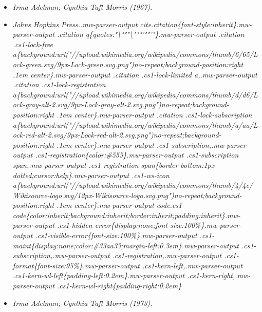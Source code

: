 \begin{itemize}
\item
  \emph{Irma Adelman; Cynthia Taft Morris (1967).}
\item
  \emph{Johns Hopkins Press..mw-parser-output
  cite.citation\{font-style:inherit\}.mw-parser-output .citation
  q\{quotes:"\textbackslash{}"""\textbackslash{}"""'""'"\}.mw-parser-output
  .citation .cs1-lock-free
  a\{background:url("//upload.wikimedia.org/wikipedia/commons/thumb/6/65/Lock-green.svg/9px-Lock-green.svg.png")no-repeat;background-position:right
  .1em center\}.mw-parser-output .citation .cs1-lock-limited
  a,.mw-parser-output .citation .cs1-lock-registration
  a\{background:url("//upload.wikimedia.org/wikipedia/commons/thumb/d/d6/Lock-gray-alt-2.svg/9px-Lock-gray-alt-2.svg.png")no-repeat;background-position:right
  .1em center\}.mw-parser-output .citation .cs1-lock-subscription
  a\{background:url("//upload.wikimedia.org/wikipedia/commons/thumb/a/aa/Lock-red-alt-2.svg/9px-Lock-red-alt-2.svg.png")no-repeat;background-position:right
  .1em center\}.mw-parser-output .cs1-subscription,.mw-parser-output
  .cs1-registration\{color:\#555\}.mw-parser-output .cs1-subscription
  span,.mw-parser-output .cs1-registration span\{border-bottom:1px
  dotted;cursor:help\}.mw-parser-output .cs1-ws-icon
  a\{background:url("//upload.wikimedia.org/wikipedia/commons/thumb/4/4c/Wikisource-logo.svg/12px-Wikisource-logo.svg.png")no-repeat;background-position:right
  .1em center\}.mw-parser-output
  code.cs1-code\{color:inherit;background:inherit;border:inherit;padding:inherit\}.mw-parser-output
  .cs1-hidden-error\{display:none;font-size:100\%\}.mw-parser-output
  .cs1-visible-error\{font-size:100\%\}.mw-parser-output
  .cs1-maint\{display:none;color:\#33aa33;margin-left:0.3em\}.mw-parser-output
  .cs1-subscription,.mw-parser-output
  .cs1-registration,.mw-parser-output
  .cs1-format\{font-size:95\%\}.mw-parser-output
  .cs1-kern-left,.mw-parser-output
  .cs1-kern-wl-left\{padding-left:0.2em\}.mw-parser-output
  .cs1-kern-right,.mw-parser-output
  .cs1-kern-wl-right\{padding-right:0.2em\}}
\item
  \emph{Irma Adelman; Cynthia Taft Morris (1973).}
\end{itemize}


